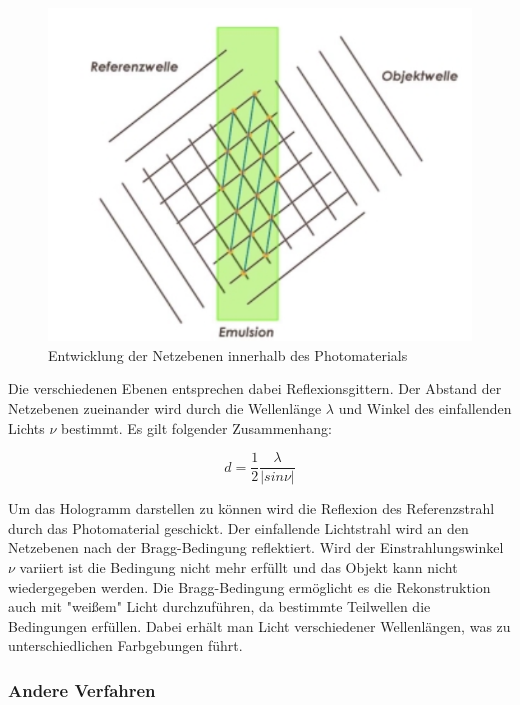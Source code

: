 \documentclass[12pt,a4paper]{article}
\begin{document}
\begin{figure}[h]
	\includegraphics[scale = 0.5]{refsteh.png}
	\centering
	\caption{Entwicklung der Netzebenen innerhalb des Photomaterials}
	\label{66}
\end{figure}

Die verschiedenen Ebenen entsprechen dabei Reflexionsgittern. Der Abstand der Netzebenen zueinander wird durch die Wellenlänge $\lambda$ und Winkel des einfallenden Lichts $\nu$ bestimmt. Es gilt folgender Zusammenhang:

\begin{equation}
d = \frac{1}{2} \frac{\lambda}{|sin \nu|}
\label {1}
\end{equation}

Um das Hologramm darstellen zu können wird die Reflexion des Referenzstrahl durch das Photomaterial geschickt. Der einfallende Lichtstrahl wird an den Netzebenen nach der Bragg-Bedingung reflektiert. Wird der Einstrahlungswinkel $\nu$ variiert ist die Bedingung nicht mehr erfüllt und das Objekt kann nicht wiedergegeben werden. Die Bragg-Bedingung ermöglicht es die Rekonstruktion auch mit "weißem" Licht durchzuführen, da bestimmte Teilwellen die Bedingungen erfüllen. Dabei erhält man Licht verschiedener Wellenlängen, was zu unterschiedlichen Farbgebungen führt. 

\subsubsection{Andere Verfahren}
\end{document}
